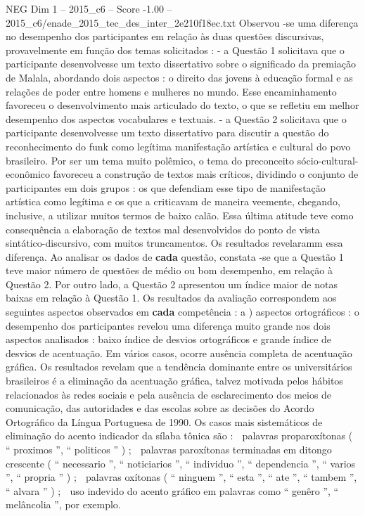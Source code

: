 \begin{textsample}{NEG Dim 1 – 2015\_c6 – Score -1.00 – 2015\_c6/enade\_2015\_tec\_des\_inter\_2e210f18ec.txt}
Observou -se uma diferença no desempenho dos participantes em relação às duas questões discursivas, provavelmente em função dos temas solicitados : - a Questão 1 solicitava que o participante desenvolvesse um texto dissertativo sobre o significado da premiação de Malala, abordando dois aspectos : o direito das jovens à educação formal e as relações de poder entre homens e mulheres no mundo.
Esse encaminhamento favoreceu o desenvolvimento mais articulado do texto, o que se refletiu em melhor desempenho dos aspectos vocabulares e textuais. - a Questão 2 solicitava que o participante desenvolvesse um texto dissertativo para discutir a questão do reconhecimento do funk como legítima manifestação artística e cultural do povo brasileiro.
Por ser um tema muito polêmico, o tema do preconceito sócio-cultural-econômico favoreceu a construção de textos mais críticos, dividindo o conjunto de participantes em dois grupos : os que defendiam esse tipo de manifestação artística como legítima e os que a criticavam de maneira veemente, chegando, inclusive, a utilizar muitos termos de baixo calão.
Essa última atitude teve como consequência a elaboração de textos mal desenvolvidos do ponto de vista sintático-discursivo, com muitos truncamentos.
Os resultados revelaramm essa diferença.
Ao analisar os dados de \textbf{cada} questão, constata -se que a Questão 1 teve maior número de questões de médio ou bom desempenho, em relação à Questão 2.
Por outro lado, a Questão 2 apresentou um índice maior de notas baixas em relação à Questão 1.
Os resultados da avaliação correspondem aos seguintes aspectos observados em \textbf{cada} competência : a ) aspectos ortográficos : o desempenho dos participantes revelou uma diferença muito grande nos dois aspectos analisados : baixo índice de desvios ortográficos e grande índice de desvios de acentuação.
Em vários casos, ocorre ausência completa de acentuação gráfica.
Os resultados revelam que a tendência dominante entre os universitários brasileiros é a eliminação da acentuação gráfica, talvez motivada pelos hábitos relacionados às redes sociais e pela ausência de esclarecimento dos meios de comunicação, das autoridades e das escolas sobre as decisões do Acordo Ortográfico da Língua Portuguesa de 1990.
Os casos mais sistemáticos de eliminação do acento indicador da sílaba tônica são :  palavras proparoxítonas ( “ proximos ”, “ politicos ” ) ;  palavras paroxítonas terminadas em ditongo crescente ( “ necessario ”, “ noticiarios ”, “ individuo ”, “ dependencia ”, “ varios ”, “ propria ” ) ;  palavras oxítonas ( “ ninguem ”, “ esta ”, “ ate ”, “ tambem ”, “ alvara ” ) ;  uso indevido do acento gráfico em palavras como “ genêro ”, “ melâncolia ”, por exemplo.

\end{textsample}
